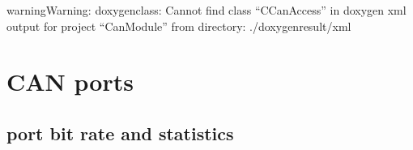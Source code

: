 \documentclass[a4paper,10pt,english]{sphinxmanual}
\begin{document}
\begin{sphinxadmonition}{warning}{Warning:}
\sphinxAtStartPar
doxygenclass: Cannot find class “CCanAccess” in doxygen xml output for project “CanModule” from directory: ./doxygen\sphinxhyphen{}result/xml
\end{sphinxadmonition}


\chapter{CAN ports}
\label{\detokenize{canports:can-ports}}\label{\detokenize{canports::doc}}

\section{port bit rate and statistics}
\label{\detokenize{canports:port-bit-rate-and-statistics}}
\end{document}
